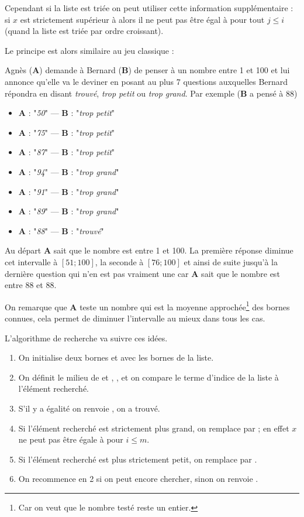 Cependant si la liste est triée on peut utiliser cette information supplémentaire : si $x$ est strictement supérieur à  alors il ne peut pas être égal à  pour tout $j\le i$ (quand la liste est triée par ordre croissant).

Le principe est alors similaire au jeu classique :

Agnès ({\bf A}) demande à Bernard ({\bf B}) de penser à un nombre entre 1 et 100 et lui annonce qu'elle va le deviner en posant au plus 7 questions auxquelles Bernard répondra en disant {\it trouvé}, {\it trop petit} ou {\it trop grand}. Par exemple ({\bf B} a pensé à 88)
\begin{itemize}
  \item {\bf A} : "{\it 50}" --- {\bf B} : "{\it trop petit}"
  \item {\bf A} : "{\it 75}" --- {\bf B} : "{\it trop petit}"
  \item {\bf A} : "{\it 87}" --- {\bf B} : "{\it trop petit}"
  \item {\bf A} : "{\it 94}" --- {\bf B} : "{\it trop grand}"
  \item {\bf A} : "{\it 91}" --- {\bf B} : "{\it trop grand}"
  \item {\bf A} : "{\it 89}" --- {\bf B} : "{\it trop grand}"
  \item {\bf A} : "{\it 88}" --- {\bf B} : "{\it trouvé}"
\end{itemize}

Au départ {\bf A} sait que le nombre est entre 1 et 100. La première réponse diminue cet intervalle à $[51;100]$, la seconde à $[76;100]$ et ainsi de suite jusqu'à la dernière question qui n'en est pas vraiment une car {\bf A} sait que le nombre est entre 88 et 88.

On remarque que {\bf A} teste un nombre qui est la moyenne approchée\footnote{Car on veut que le nombre testé reste un entier.} des bornes connues, cela permet de diminuer l'intervalle au mieux dans tous les cas.

\medskip

L'algorithme de recherche va suivre ces idées.
\begin{enumerate}
  \item On initialise deux bornes  et  avec les bornes de la liste.
  \item On définit le milieu de  et , , et on compare le terme d'indice  de la liste à l'élément recherché.
  \item S'il y a égalité on renvoie , on a trouvé.
  \item Si l'élément recherché est strictement plus grand, on remplace  par  ; en effet $x$ ne peut pas être égale à  pour $i\le m$.
  \item Si l'élément recherché est plus strictement petit, on remplace  par .
  \item On recommence en 2 si on peut encore chercher, sinon on renvoie .
\end{enumerate}
